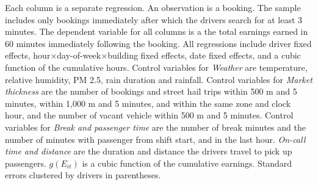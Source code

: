 \documentclass[reviewmode,AEJ]{AEA}
\begin{document}
\begin{table}[]
\begin{tablenotes}
		Each column is a separate regression. An observation is a booking. The sample includes only bookings immediately after which the drivers search for at least 3 minutes. The dependent variable for all columns is a the total earnings earned in 60 minutes immediately following the booking. All regressions include driver fixed effects, hour\(\times\)day-of-week\(\times\)building fixed effects, date fixed effects, and a cubic function of the cumulative hours. Control variables for \textit{Weather} are temperature, relative humidity, PM 2.5, rain duration and rainfall. Control variables for \textit{Market thickness} are the number of bookings and street hail trips within 500 m and 5 minutes, within 1,000 m and 5 minutes, and within the same zone and clock hour, and the number of vacant vehicle within 500 m and 5 minutes. Control variables for \textit{Break and passenger time} are the number of break minutes and the number of minutes with passenger from shift start, and in the last hour. \textit{On-call time and distance} are the duration and distance the drivers travel to pick up passengers. \(g(E_{it})\) is a cubic function of the cumulative earnings. Standard errors clustered by drivers in parentheses.%
	\end{tablenotes}
\end{table}
\end{document}
